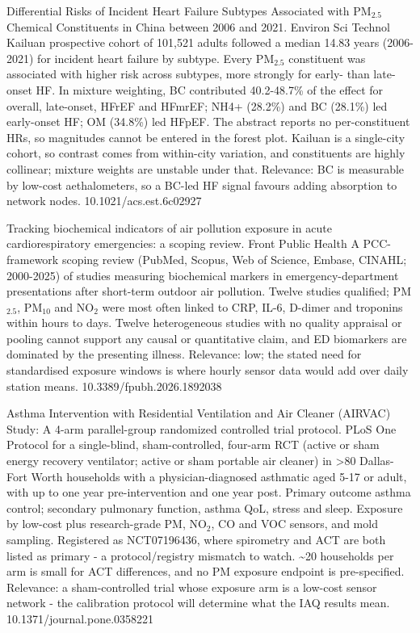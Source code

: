 \documentclass[10pt]{article}
\begin{document}
{Differential Risks of Incident Heart Failure Subtypes Associated with PM$_{2.5}$ Chemical Constituents in China between 2006 and 2021.}
{Environ Sci Technol}
{Kailuan prospective cohort of 101,521 adults followed a median 14.83 years (2006-2021) for incident heart failure by subtype. Every PM$_{2.5}$ constituent was associated with higher risk across subtypes, more strongly for early- than late-onset HF. In mixture weighting, BC contributed 40.2-48.7\% of the effect for overall, late-onset, HFrEF and HFmrEF; NH4+ (28.2\%) and BC (28.1\%) led early-onset HF; OM (34.8\%) led HFpEF. The abstract reports no per-constituent HRs, so magnitudes cannot be entered in the forest plot. Kailuan is a single-city cohort, so contrast comes from within-city variation, and constituents are highly collinear; mixture weights are unstable under that. Relevance: BC is measurable by low-cost aethalometers, so a BC-led HF signal favours adding absorption to network nodes.}
{10.1021/acs.est.6c02927}

{Tracking biochemical indicators of air pollution exposure in acute cardiorespiratory emergencies: a scoping review.}
{Front Public Health}
{A PCC-framework scoping review (PubMed, Scopus, Web of Science, Embase, CINAHL; 2000-2025) of studies measuring biochemical markers in emergency-department presentations after short-term outdoor air pollution. Twelve studies qualified; PM$_{2.5}$, PM$_{10}$ and NO$_2$ were most often linked to CRP, IL-6, D-dimer and troponins within hours to days. Twelve heterogeneous studies with no quality appraisal or pooling cannot support any causal or quantitative claim, and ED biomarkers are dominated by the presenting illness. Relevance: low; the stated need for standardised exposure windows is where hourly sensor data would add over daily station means.}
{10.3389/fpubh.2026.1892038}


{Asthma Intervention with Residential Ventilation and Air Cleaner (AIRVAC) Study: A 4-arm parallel-group randomized controlled trial protocol.}
{PLoS One}
{Protocol for a single-blind, sham-controlled, four-arm RCT (active or sham energy recovery ventilator; active or sham portable air cleaner) in >80 Dallas-Fort Worth households with a physician-diagnosed asthmatic aged 5-17 or adult, with up to one year pre-intervention and one year post. Primary outcome asthma control; secondary pulmonary function, asthma QoL, stress and sleep. Exposure by low-cost plus research-grade PM, NO$_2$, CO and VOC sensors, and mold sampling. Registered as NCT07196436, where spirometry and ACT are both listed as primary - a protocol/registry mismatch to watch. \textasciitilde{}20 households per arm is small for ACT differences, and no PM exposure endpoint is pre-specified. Relevance: a sham-controlled trial whose exposure arm is a low-cost sensor network - the calibration protocol will determine what the IAQ results mean.}
{10.1371/journal.pone.0358221}
\end{document}
